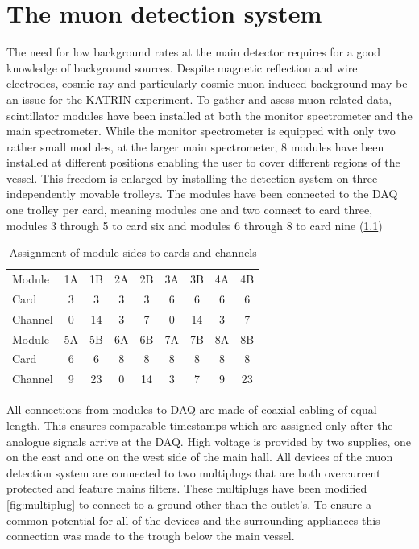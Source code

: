 
\chapter{The muon detection system}
\label{ch:The muon detection system}
  The need for low background rates at the main detector requires for a good knowledge of background sources. Despite magnetic reflection and wire electrodes, cosmic ray and particularly cosmic muon induced background may be an issue for the KATRIN experiment. To gather and asess muon related data, scintillator modules have been installed at both the monitor spectrometer and the main spectrometer. While the monitor spectrometer is equipped with only two rather small modules, at the larger main spectrometer, 8 modules have been installed at different positions enabling the user to cover different regions of the vessel. This freedom is enlarged by installing the detection system on three independently movable trolleys.
  The modules have been connected to the DAQ one trolley per card, meaning modules one and two connect to card three, modules 3 through 5 to card six and modules 6 through 8 to card nine (\ref{tab:connectionsModulesCards})
  \begin{table}
  	\centering
  	\begin{tabular}{| l | c c | c c | c c | c c |}
  	\hline
  		Module	& 1A	& 1B	& 2A	& 2B	& 3A	& 3B	& 4A	& 4B 	\\
  		Card	& 3	& 3	& 3	& 3	& 6	& 6	& 6	& 6	\\
  		Channel	& 0	& 14	& 3	& 7	& 0	& 14	& 3	& 7	\\
  		\hline \hline
  		Module	&5A	& 5B	& 6A	& 6B	& 7A	& 7B	& 8A	& 8B	\\
  		Card	& 6	& 6	& 8	& 8	& 8	& 8	& 8	& 8	\\
  		Channel	& 9	& 23	& 0	& 14	& 3	& 7	& 9	& 23	\\
  		\hline
  	\end{tabular}
  	\caption{Assignment of module sides to cards and channels}
  	\label{tab:connectionsModulesCards}
  \end{table}
  All connections from modules to DAQ are made of coaxial cabling of equal length. This ensures comparable timestamps which are assigned only after the analogue signals arrive at the DAQ. High voltage is provided by two supplies, one on the east and one on the west side of the main hall.
  All devices of the muon detection system are connected to two multiplugs that are both overcurrent protected and feature mains filters. These multiplugs have been modified \ref{fig:multiplug} to connect to a ground other than the outlet's. To ensure a common potential for all of the devices and the surrounding appliances this connection was made to the trough below the main vessel.
  
